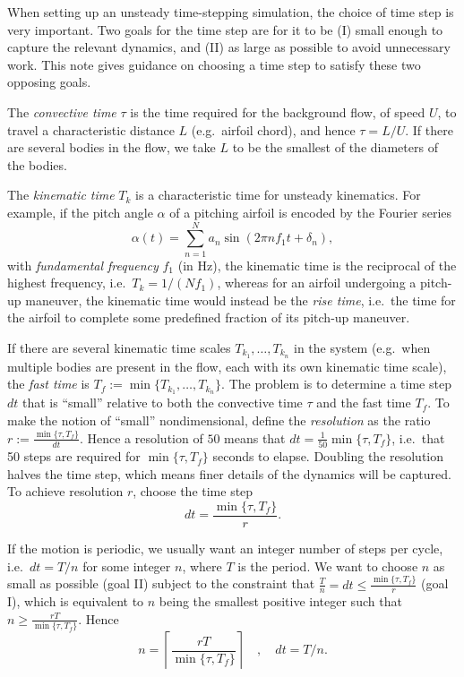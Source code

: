 \documentclass[10pt]{article}
\newcommand\defn[1]{\emph{#1}}
\def\eg{e.g.~}
\def\ie{i.e.~}
\begin{document}
When setting up an unsteady time-stepping simulation, the choice of time step is very important.  Two goals for the time step are for it to be (I) small enough to capture the relevant dynamics, and (II) as large as possible to avoid unnecessary work.  This note gives guidance on choosing a time step to satisfy these two opposing goals.

The \defn{convective time} $\tau$ is the time required for the background flow, of speed $U$, to travel a characteristic distance $L$ (\eg airfoil chord), and hence $\tau = L/U$.  If there are several bodies in the flow, we take $L$ to be the smallest of the diameters of the bodies.

The \defn{kinematic time} $T_k$ is a characteristic time for unsteady kinematics.  For example, if the pitch angle $\alpha$ of a pitching airfoil is encoded by the Fourier series
\begin{equation}\label{eqn:fourier}
\alpha(t)=\sum_{n=1}^Na_n\sin(2\pi nf_1t+\delta_n),
\end{equation}
with \defn{fundamental frequency} $f_1$ (in Hz), the kinematic time is the reciprocal of the highest frequency, \ie $T_k=1/(Nf_1)$, whereas for an airfoil undergoing a pitch-up maneuver, the kinematic time would instead be the \defn{rise time}, \ie the time for the airfoil to complete some predefined fraction of its pitch-up maneuver.

If there are several kinematic time scales $T_{k_1},\ldots,T_{k_n}$ in the system (\eg when multiple bodies are present in the flow, each with its own kinematic time scale), the \defn{fast time} is $T_f:=\min\{T_{k_1},\ldots,T_{k_n}\}$.  The problem is to determine a time step $dt$ that is ``small'' relative to both the convective time $\tau$ and the fast time $T_f$.  To make the notion of ``small'' nondimensional, define the \defn{resolution} as the ratio $r:=\frac{\min\{\tau,T_f\}}{dt}$.  Hence a resolution of $50$ means that $dt=\frac{1}{50}\min\{\tau,T_f\}$, \ie that 50 steps are required for $\min\{\tau,T_f\}$ seconds to elapse.  Doubling the resolution halves the time step, which means finer details of the dynamics will be captured.  To achieve resolution $r$, choose the time step \[dt=\frac{\min\{\tau,T_f\}}{r}.\]

If the motion is periodic, we usually want an integer number of steps per cycle, \ie $dt=T/n$ for some integer $n$, where $T$ is the period.  We want to choose $n$ as small as possible (goal II) subject to the constraint that $\frac{T}{n}=dt\leq\frac{\min\{\tau,T_f\}}{r}$ (goal I), which is equivalent to $n$ being the smallest positive integer such that $n\geq\frac{rT}{\min\{\tau,T_f\}}$.  Hence \[n=\left\lceil\frac{rT}{\min\{\tau,T_f\}}\right\rceil\quad,\quad dt=T/n.\]
\end{document}
